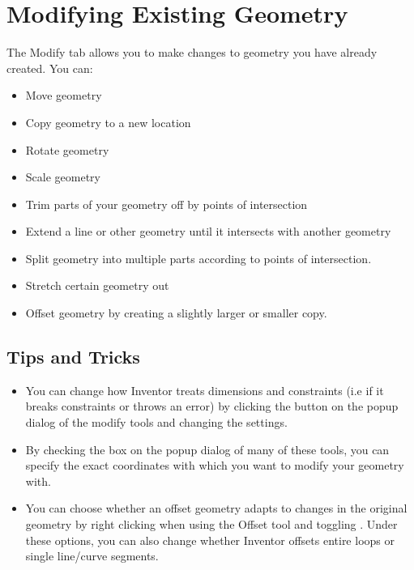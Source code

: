 \cbend

\section{Modifying Existing Geometry}

\cbstart
{}
The Modify tab allows you to make changes to geometry you have already created. You can:

\begin{itemize}
\item Move geometry
\item Copy geometry to a new location
\item Rotate geometry
\item Scale geometry
\item Trim parts of your geometry off by points of intersection
\item Extend a line or other geometry until it intersects with another geometry
\item Split geometry into multiple parts according to points of intersection.
\item Stretch certain geometry out
\item Offset geometry by creating a slightly larger or smaller copy.
\end{itemize}
\cbend

\subsection{Tips and Tricks}
\cbstart
{}
\begin{itemize}
\item You can change how Inventor treats dimensions and constraints (i.e if it breaks constraints or throws an error) by clicking the \appcommand{\(\gg\)} button on the popup dialog of the modify tools and changing the settings.
\item By checking the  box on the popup dialog of many of these tools, you can specify the exact coordinates with which you want to modify your geometry with.
\item You can choose whether an offset geometry adapts to changes in the original geometry by right clicking when using the Offset tool and toggling . Under these options, you can also change whether Inventor offsets entire loops or single line/curve segments.
\end{itemize}
\cbend

